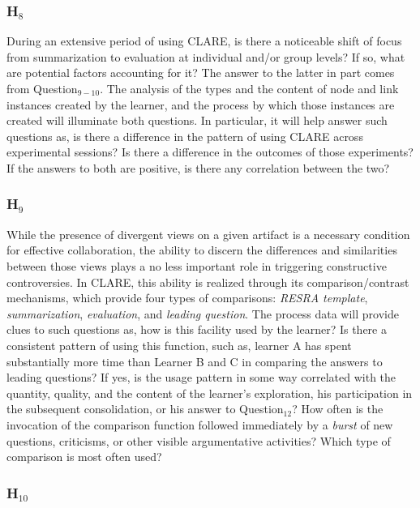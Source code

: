 \subsubsection{H\(_8\)}
\label{sec:SECAI2 data}

During an extensive period of using CLARE, is there a noticeable shift of
focus from summarization to evaluation at individual and/or group levels?
If so, what are potential factors accounting for it? The answer to the
latter in part comes from Question\(_{9-10}\). The analysis of the types
and the content of node and link instances created by the learner, and the
process by which those instances are created will illuminate both
questions. In particular, it will help answer such questions as, is there a
difference in the pattern of using CLARE across experimental sessions? Is
there a difference in the outcomes of those experiments? If the answers to
both are positive, is there any correlation between the two?


\subsubsection{H\(_9\)}
\label{sec:clare1 data}

While the presence of divergent views on a given artifact is a necessary
condition for effective collaboration, the ability to discern the
differences and similarities between those views plays a no less important
role in triggering constructive controversies. In CLARE, this ability is
realized through its comparison/contrast mechanisms, which provide four
types of comparisons: {\it RESRA template\/}, {\it summarization\/}, {\it
evaluation\/}, and {\it leading question\/}. The process data will provide
clues to such questions as, how is this facility used by the learner? Is
there a consistent pattern of using this function, such as, learner A has
spent substantially more time than Learner B and C in comparing the answers
to leading questions? If yes, is the usage pattern in some way correlated
with the quantity, quality, and the content of the learner's exploration,
his participation in the subsequent consolidation, or his answer to
Question\(_{12}\)? How often is the invocation of the comparison function
followed immediately by a {\it burst\/} of new questions, criticisms, or
other visible argumentative activities? Which type of comparison is most
often used?


\subsubsection{H\(_{10}\)}
\label{sec:clare2 data}


